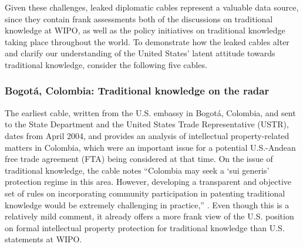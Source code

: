 \documentclass[12pt]{article}
\begin{document}
Given these challenges, leaked diplomatic cables represent a valuable 
data source, since they contain frank assessments both of the discussions on traditional 
knowledge at WIPO, as well as the policy initiatives on traditional knowledge taking place 
throughout the world. To demonstrate how the leaked cables alter and clarify our  
understanding of the United States' 
latent attitude towards traditional knowledge, consider the following five cables.

\subsubsection*{Bogot\'a, Colombia: Traditional knowledge on the radar}
The earliest 
cable, written from the U.S. embassy in Bogot\'a, Colombia, and sent to the State Department and the 
United States Trade Representative (USTR), dates from April 2004, and provides an analysis of intellectual 
property-related matters in Colombia, which were an important issue for a potential U.S.-Andean 
free trade agreement (FTA) being considered at that time. 
On the issue of traditional knowledge, the cable 
notes ``Colombia may seek a `sui generis' protection regime in this area. However, developing a 
transparent and objective set of rules on incorporating community participation in patenting 
traditional knowledge would be extremely challenging in 
practice,'' \citep{u.s._department_of_state2004andean}. Even though this 
is a relatively mild comment, it already offers a more frank view of the U.S. position on formal 
intellectual property protection for traditional knowledge than U.S. statements at WIPO.
\end{document}
